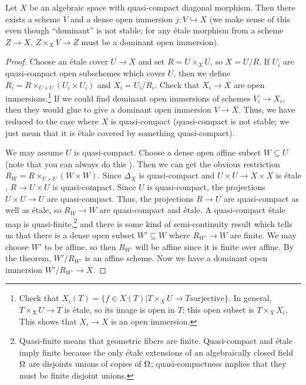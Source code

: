  \begin{corollary}\label{lec14C:sep_algsp->dense_subscheme}
   Let $X$ be an algebraic space with quasi-compact diagonal morphism. Then there exists
   a scheme $V$ and a dense open immersion $j:V\hookrightarrow X$ (we make sense of this
   even though ``dominant'' is not stable; for any \'etale morphism from a scheme $Z\to
   X$, $Z\times_X V\to Z$ must be a dominant open immersion).
 \end{corollary}
 \begin{proof}
   Choose an \'etale cover $U\to X$ and set $R=U\times_X U$, so $X=U/R$. If $U_i$ are
   quasi-compact open subschemes which cover $U$, then we define $R_i=R\times_{U\times
   U}(U_i\times U_i)$ and $X_i=U_i/R_i$. Check that $X_i\to X$ are open
   immersions.\footnote{Check that $X_i(T)=\{f\in X(T)| T\times_X U\to T \text{
   surjective}\}$. In general, $T\times_X U\to T$ is \'etale, so its image is open in
   $T$; this open subset is $T\times_X X_i$. This shows that $X_i\to X$ is an open
   immersion.} If we could find dominant open immersions of schemes $V_i\to X_i$, then
   they would glue to give a dominant open immersion $V\to X$. Thus, we have reduced to
   the case where $X$ is quasi-compact (quasi-compact is not stable; we just mean that it
   is \'etale covered by something quasi-compact).

   We may assume $U$ is quasi-compact. Choose a dense open affine subset $W\subseteq U$
   (note that you can always do this \anton{}). Then we can get the obvious restriction
   $R_W=R\times_{U\times U} (W\times W)$. Since $\Delta_X$ is quasi-compact and $U\times
   U\to X\times X$ is \'etale , $R\to U\times U$
   is quasi-compact. Since $U$ is quasi-compact, the projections $U\times U\to U$ are
   quasi-compact. Thus, the projections $R\to U$ are quasi-compact as well as \'etale, so
   $R_W\to W$ are quasi-compact and \'etale. A quasi-compact \'etale map is
   quasi-finite,\footnote{Quasi-finite means that geometric fibers are finite.
   Quasi-compact and \'etale imply finite because the only \'etale extensions of an
   algebraically closed field $\Omega$ are disjoints unions of copies of $\Omega$;
   quasi-compactness implies that they must be finite disjoint unions.} and there is some
   kind of semi-continuity result \anton{} which tells us that there is a dense open
   subset $W'\subseteq W$ where $R_{W'}\to W$ are finite. We may choose $W'$ to be
   affine, so then $R_{W'}$ will be affine since it is finite over affine. By the
   theorem, $W'/R_{W'}$ is an affine scheme. Now we have a dominant open immersion
   $W'/R_{W'}\to X$.\anton{}
%
%
 \end{proof}

